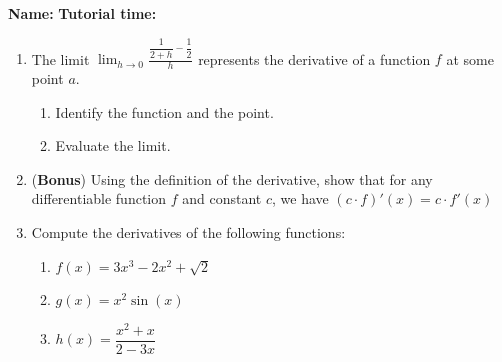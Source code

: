 \documentclass[12pt]{article}
\newcommand{\di}{\displaystyle}
\begin{document}
{\bf \large Name:} \hspace{2.5in} {\bf Tutorial time:}

\bigskip

\bigskip

\thispagestyle{fancy}

 \begin{enumerate}
 \item  The limit $\di \lim_{h\to 0}\frac{\dfrac{1}{2+h}-\dfrac{1}{2}}{h}$ represents the derivative of a function $f$ at some point $a$.
\begin{enumerate}
 \item Identify the function and the point. 

\vspace{1in}

 \item Evaluate the limit.
 \end{enumerate}

\vspace{3in}

 \item (\textbf{Bonus}) Using the definition of the derivative, show that for any differentiable function $f$ and constant $c$, we have $(c\cdot f)'(x) = c\cdot f'(x)$

\newpage

 \item Compute the derivatives of the following functions:
\begin{enumerate}
 \item $f(x) = 3x^3-2x^2+\sqrt{2}$

\vspace{2in}

 \item $g(x) = x^2\sin(x)$

\vspace{2in}

 \item $h(x) = \dfrac{x^2+x}{2-3x}$
\end{enumerate}
\end{enumerate}
\
\end{document}
